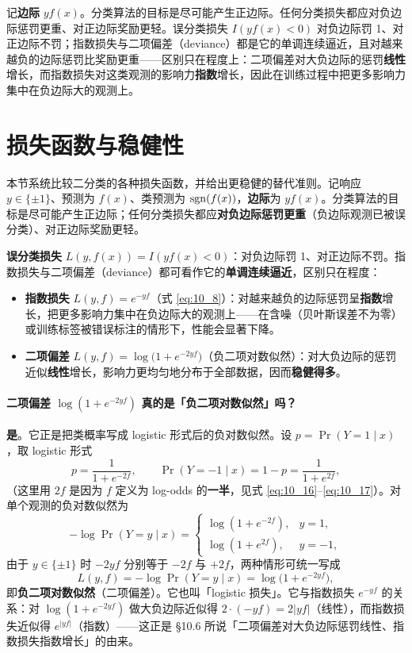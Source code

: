 \begin{remark}[边际与损失函数]
记\textbf{边际} $y f(x)$。分类算法的目标是尽可能产生正边际。任何分类损失都应对负边际惩罚更重、对正边际奖励更轻。误分类损失 $I(yf(x) < 0)$ 对负边际罚 1、对正边际不罚；指数损失与二项偏差（deviance）都是它的单调连续逼近，且对越来越负的边际惩罚比奖励更重——区别只在程度上：二项偏差对大负边际的惩罚\textbf{线性}增长，而指数损失对这类观测的影响力\textbf{指数}增长，因此在训练过程中把更多影响力集中在负边际大的观测上。
\end{remark}

\section{损失函数与稳健性}

本节系统比较二分类的各种损失函数，并给出更稳健的替代准则。记响应 $y \in \{\pm 1\}$、预测为 $f(x)$、类预测为 $\mathrm{sgn}(f(x))$，\textbf{边际}为 $y f(x)$。分类算法的目标是尽可能产生正边际；任何分类损失都应\textbf{对负边际惩罚更重}（负边际观测已被误分类）、对正边际奖励更轻。

\textbf{误分类损失} $L(y, f(x)) = I(yf(x) < 0)$：对负边际罚 1、对正边际不罚。指数损失与二项偏差（deviance）都可看作它的\textbf{单调连续逼近}，区别只在程度：
\begin{itemize}
    \item \textbf{指数损失} $L(y, f) = e^{-yf}$（式 \eqref{eq:10_8}）：对越来越负的边际惩罚呈\textbf{指数}增长，把更多影响力集中在负边际大的观测上——在含噪（贝叶斯误差不为零）或训练标签被错误标注的情形下，性能会显著下降。
    \item \textbf{二项偏差} $L(y, f) = \log\bigl(1 + e^{-2yf}\bigr)$（负二项对数似然）：对大负边际的惩罚近似\textbf{线性}增长，影响力更均匀地分布于全部数据，因而\textbf{稳健得多}。
\end{itemize}

\paragraph{二项偏差 $\log(1+e^{-2yf})$ 真的是「负二项对数似然」吗？}

\textbf{是}。它正是把类概率写成 logistic 形式后的负对数似然。设 $p = \Pr(Y=1 \mid x)$，取 logistic 形式
\[
    p = \frac{1}{1+e^{-2f}}, \qquad \Pr(Y=-1 \mid x) = 1-p = \frac{1}{1+e^{2f}},
\]
（这里用 $2f$ 是因为 $f$ 定义为 log-odds 的\textbf{一半}，见式 \eqref{eq:10_16}--\eqref{eq:10_17}）。对单个观测的负对数似然为
\[
    -\log \Pr(Y=y \mid x) = \begin{cases} \log(1+e^{-2f}), & y = 1,\\ \log(1+e^{2f}), & y = -1, \end{cases}
\]
由于 $y \in \{\pm 1\}$ 时 $-2yf$ 分别等于 $-2f$ 与 $+2f$，两种情形可统一写成
\[
    L(y, f) = -\log \Pr(Y = y \mid x) = \log\bigl(1 + e^{-2yf}\bigr),
\]
即\textbf{负二项对数似然}（二项偏差）。它也叫「logistic 损失」。它与指数损失 $e^{-yf}$ 的关系：对 $\log(1+e^{-2yf})$ 做大负边际近似得 $2\cdot(-yf) = 2|yf|$（线性），而指数损失近似得 $e^{|yf|}$（指数）——这正是 §10.6 所说「二项偏差对大负边际惩罚线性、指数损失指数增长」的由来。

